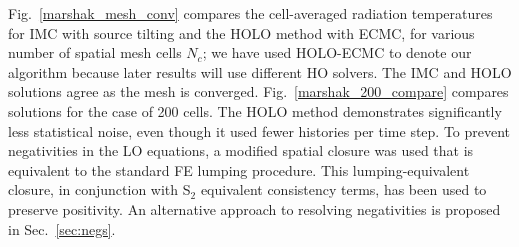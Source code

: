 \documentclass[11pt]{article}
\begin{document}
Fig.~\ref{marshak_mesh_conv} compares the cell-averaged radiation temperatures  for
IMC with source tilting and the HOLO method with ECMC, for various number of spatial mesh cells $N_c$; we
have used HOLO-ECMC to denote our algorithm because later results will use different
HO solvers.  The IMC and HOLO solutions agree as the mesh is converged.  
Fig.~\ref{marshak_200_compare} compares solutions
for the case of 200 cells.  The HOLO method demonstrates significantly less
statistical noise, even though it used fewer histories per time step. To prevent
negativities in the LO equations, a modified spatial closure was used that is equivalent to the
standard FE lumping procedure.  This lumping-equivalent closure, in conjunction with S$_2$ equivalent consistency
terms, has been used to preserve positivity.  An alternative approach to resolving negativities is proposed in Sec.~\ref{sec:negs}.
\end{document}

